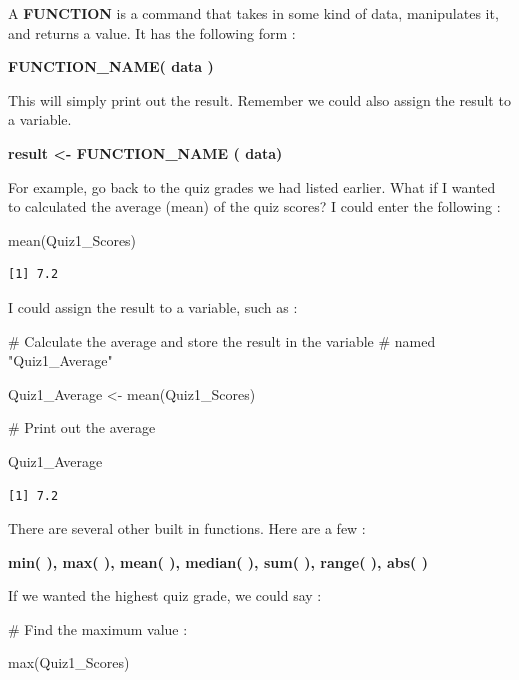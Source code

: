 \documentclass[
  letterpaper,
  DIV=11,
  numbers=noendperiod]{scrreprt}
\newenvironment{Shaded}{\begin{snugshade}}{\end{snugshade}}
\newcommand{\CommentTok}[1]{\textcolor[rgb]{0.37,0.37,0.37}{#1}}
\newcommand{\FunctionTok}[1]{\textcolor[rgb]{0.28,0.35,0.67}{#1}}
\newcommand{\NormalTok}[1]{\textcolor[rgb]{0.00,0.23,0.31}{#1}}
\newcommand{\OtherTok}[1]{\textcolor[rgb]{0.00,0.23,0.31}{#1}}
\begin{document}
A \textbf{FUNCTION} is a command that takes in some kind of data,
manipulates it, and returns a value. It has the following form :

\textbf{FUNCTION\_NAME( data )}

This will simply print out the result. Remember we could also assign the
result to a variable.

\textbf{result \textless- FUNCTION\_NAME ( data)}

For example, go back to the quiz grades we had listed earlier. What if I
wanted to calculated the average (mean) of the quiz scores? I could
enter the following :

\begin{Shaded}
\begin{Highlighting}[]
\FunctionTok{mean}\NormalTok{(Quiz1\_Scores)}
\end{Highlighting}
\end{Shaded}

\begin{verbatim}
[1] 7.2
\end{verbatim}

I could assign the result to a variable, such as :

\begin{Shaded}
\begin{Highlighting}[]
\CommentTok{\# Calculate the average and store the result in the variable }
\CommentTok{\# named "Quiz1\_Average"}

\NormalTok{Quiz1\_Average }\OtherTok{\textless{}{-}} \FunctionTok{mean}\NormalTok{(Quiz1\_Scores)}

\CommentTok{\# Print out the average}

\NormalTok{Quiz1\_Average}
\end{Highlighting}
\end{Shaded}

\begin{verbatim}
[1] 7.2
\end{verbatim}

There are several other built in functions. Here are a few :

\textbf{min( ), max( ), mean( ), median( ), sum( ), range( ), abs( )}

If we wanted the highest quiz grade, we could say :

\begin{Shaded}
\begin{Highlighting}[]
\CommentTok{\# Find the maximum value :}

\FunctionTok{max}\NormalTok{(Quiz1\_Scores)}
\end{Highlighting}
\end{Shaded}
\end{document}

